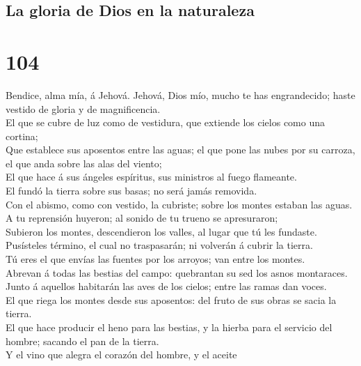 \hypertarget{la-gloria-de-dios-en-la-naturaleza}{%
\subsection{La gloria de Dios en la
naturaleza}\label{la-gloria-de-dios-en-la-naturaleza}}

\hypertarget{section-103}{%
\section{104}\label{section-103}}

 Bendice, alma mía, á Jehová. Jehová, Dios mío, mucho te
has engrandecido; haste vestido de gloria y de magnificencia.\\
 El que se cubre de luz como de vestidura, que extiende
los cielos como una cortina;\\
 Que establece sus aposentos entre las aguas; el que pone
las nubes por su carroza, el que anda sobre las alas del viento;\\
 El que hace á sus ángeles espíritus, sus ministros al
fuego flameante.\\
 El fundó la tierra sobre sus basas; no será jamás
removida.\\
 Con el abismo, como con vestido, la cubriste; sobre los
montes estaban las aguas.\\
 A tu reprensión huyeron; al sonido de tu trueno se
apresuraron;\\
 Subieron los montes, descendieron los valles, al lugar
que tú les fundaste.\\
 Pusísteles término, el cual no traspasarán; ni volverán á
cubrir la tierra.\\
 Tú eres el que envías las fuentes por los arroyos; van
entre los montes.\\
 Abrevan á todas las bestias del campo: quebrantan su sed
los asnos montaraces.\\
 Junto á aquellos habitarán las aves de los cielos; entre
las ramas dan voces.\\
 El que riega los montes desde sus aposentos: del fruto
de sus obras se sacia la tierra.\\
 El que hace producir el heno para las bestias, y la
hierba para el servicio del hombre; sacando el pan de la tierra.\\
 Y el vino que alegra el corazón del hombre, y el aceite
